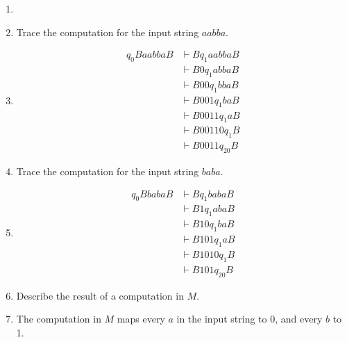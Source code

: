 \documentclass[a4paper, 12pt]{article}
\makeatletter
\renewenvironment{proof}[1][\proofname]{\par
  \normalfont \topsep6\p@\@plus6\p@\relax
  \trivlist
  \item[\hskip\labelsep
        \itshape
    #1\@addpunct{.}]\ignorespaces
}{%
  \endtrivlist\@endpefalse
}
\renewcommand{\proofname}{Solution:}
\makeatother
\begin{document}
\begin{enumerate}
\begin{enumerate}
\begin{proof}
\begin{center}
                    \end{center}
                \end{proof}
            \item Trace the computation for the input string $aabba$.
                \begin{proof}
                    \begin{align*}
                        q_0BaabbaB &\vdash Bq_1aabbaB \\
                        &\vdash B0q_1abbaB \\
                        &\vdash B00q_1bbaB \\
                        &\vdash B001q_1baB \\
                        &\vdash B0011q_1aB \\
                        &\vdash B00110q_1B \\
                        &\vdash B0011q_20B
                    \end{align*}
                \end{proof}
            \item Trace the computation for the input string $baba$.
                \begin{proof}
                    \begin{align*}
                        q_0BbabaB &\vdash Bq_1babaB \\
                        &\vdash B1q_1abaB \\
                        &\vdash B10q_1baB \\
                        &\vdash B101q_1aB \\
                        &\vdash B1010q_1B \\
                        &\vdash B101q_20B
                    \end{align*}
                \end{proof}
            \item Describe the result of a computation in $M$.
                \begin{proof}
                    The computation in $M$ maps every $a$ in the input string to $0$, and every $b$ to 1.
                \end{proof}
        \end{enumerate}


\end{enumerate}
\end{document}
